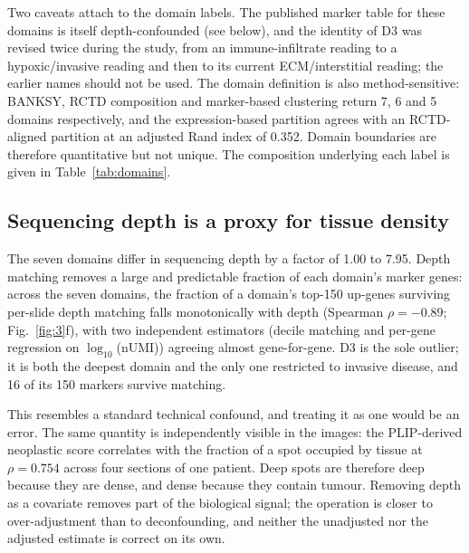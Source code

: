 Two caveats attach to the domain labels. The published marker table for these domains is
itself depth-confounded (see below), and the identity of D3 was revised twice during the
study, from an immune-infiltrate reading to a hypoxic/invasive reading and then to its
current ECM/interstitial reading; the earlier names should not be used. The domain
definition is also method-sensitive: BANKSY, RCTD composition and marker-based clustering
return 7, 6 and 5 domains respectively, and the expression-based partition agrees with an
RCTD-aligned partition at an adjusted Rand index of 0.352. Domain boundaries are therefore
quantitative but not unique. The composition underlying each label is given in
Table~\ref{tab:domains}.





\subsection{Sequencing depth is a proxy for tissue density}

The seven domains differ in sequencing depth by a factor of 1.00 to 7.95. Depth matching
removes a large and predictable fraction of each domain's marker genes: across the seven
domains, the fraction of a domain's top-150 up-genes surviving per-slide depth matching
falls monotonically with depth (Spearman $\rho=-0.89$; Fig.~\ref{fig:3}f), with two
independent estimators (decile matching and per-gene regression on $\log_{10}$(nUMI))
agreeing almost gene-for-gene. D3 is the sole outlier; it is both the deepest domain and the
only one restricted to invasive disease, and 16 of its 150 markers survive matching.

This resembles a standard technical confound, and treating it as one would be an error. The
same quantity is independently visible in the images: the PLIP-derived neoplastic score
correlates with the fraction of a spot occupied by tissue at $\rho=0.754$ across four
sections of one patient. Deep spots are therefore deep because they are dense, and dense
because they contain tumour. Removing depth as a covariate removes part of the biological
signal; the operation is closer to over-adjustment than to deconfounding, and neither the
unadjusted nor the adjusted estimate is correct on its own.

